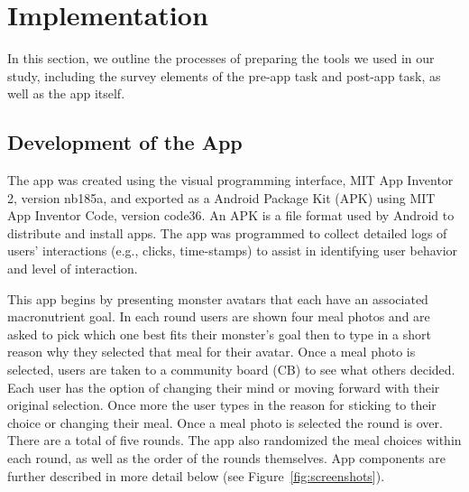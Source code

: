 \vspace{-5pt}
\section{Implementation}
In this section, we outline the processes of preparing the tools we used in our study, including the survey elements of the pre-app task and post-app task, as well as the app itself.
\vspace{-5pt}
\subsection{Development of the App}
The app was created using the visual programming interface, MIT App Inventor 2, version nb185a, and exported as a Android Package Kit (APK) using MIT App Inventor Code, version code36. An APK is a file format used by Android to distribute and install apps. The app was programmed to collect detailed logs of users' interactions (e.g., clicks, time-stamps) to assist in identifying user behavior and level of interaction. 


This app begins by presenting monster avatars that each have an associated macronutrient goal. In each round users are shown four meal photos and are asked to pick which one best fits their monster's goal then to type in a short reason why they selected that meal for their avatar. Once a meal photo is selected, users are taken to a community board (CB) to see what others decided. Each user has the option of changing their mind or moving forward with their original selection. Once more the user types in the reason for sticking to their choice or changing their meal. Once a meal photo is selected the round is over. There are a total of five rounds. The app also randomized the meal choices within each round, as well as the order of the rounds themselves. App components are further described in more detail below (see Figure~\ref{fig:screenshots}).



